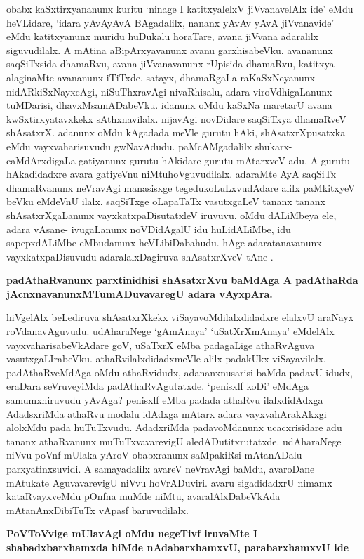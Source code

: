 obabx kaSxtirxyananunx kuritu `ninage I katitxyalelxV jiVvanavelAlx ide' eMdu heVLidare, `idara yAvAyAvA BAgadalilx, nananx yAvAv yAvA jiVvanavide' eMdu katitxyanunx muridu huDukalu horaTare, avana jiVvana adaralilx siguvudilalx. A mAtina aBipArxyavanunx avanu garxhisabeVku. avananunx saqSiTxsida dhamaRvu, avana jiVvanavanunx rUpisida dhamaRvu, katitxya alaginaMte avananunx iTiTxde. satayx, dhamaRgaLa raKaSxNeyanunx nidARkiSxNayxcAgi, niSuThxravAgi nivaRhisalu, adara viroVdhigaLanunx tuMDarisi, dhavxMsamADabeVku. idanunx oMdu kaSxNa maretarU avana kwSxtirxyatavxkekx sAthxnavilalx. nijavAgi novDidare saqSiTxya dhamaRveV shAsatxrX. adanunx oMdu kAgadada meVle gurutu hAki, shAsatxrXpusatxka eMdu vayxvaharisuvudu gwNavAdudu. paMcAMgadalilx shukarx-caMdArxdigaLa gatiyanunx gurutu hAkidare gurutu mAtarxveV adu. A gurutu hAkadidadxre avara gatiyeVnu niMtuhoVguvudilalx. adaraMte AyA saqSiTx dhamaRvanunx neVravAgi manasisxge tegedukoLuLxvudAdare alilx paMkitxyeV beVku eMdeVnU ilalx. saqSiTxge oLapaTaTx vasutxgaLeV tananx tananx shAsatxrXgaLanunx vayxkatxpaDisutatxleV iruvuvu. oMdu dALiMbeya ele, adara vAsane- ivugaLanunx noVDidAgalU idu huLidALiMbe, idu sapepxdALiMbe eMbudanunx heVLibiDabahudu. hAge adaratanavanunx vayxkatxpaDisuvudu adaralalxDagiruva shAsatxrXveV tAne
.

{\bf padAthaRvanunx parxtinidhisi shAsatxrXvu baMdAga A padAthaRda jAcnxnavanunxMTumADuvavaregU adara vAyxpAra.}                               

hiVgelAlx beLediruva shAsatxrXkekx viSayavoMdilalxdidadxre elalxvU araNayx roVdanavAguvudu. udAharaNege `gAmAnaya' `uSatXrXmAnaya' eMdelAlx vayxvaharisabeVkAdare goV, uSaTxrX eMba padagaLige athaRvAguva vasutxgaLIrabeVku. athaRvilalxdidadxmeVle alilx padakUkx viSayavilalx. padAthaRveMdAga oMdu athaRvidudx, adananxnusarisi baMda padavU idudx, eraDara seVruveyiMda padAthaRvAgutatxde. `penisxlf koDi' eMdAga samumxniruvudu yAvAga? penisxlf eMba padada athaRvu ilalxdidAdxga AdadsxriMda athaRvu modalu idAdxga mAtarx adara vayxvahArakAkxgi alolxMdu pada huTuTxvudu. AdadxriMda padavoMdanunx ucacxrisidare adu tananx athaRvanunx muTuTxvavarevigU aledADutitxrutatxde. udAharaNege niVvu poVnf mUlaka yAroV obabxranunx saMpakiRsi mAtanADalu parxyatinxsuvidi. A samayadalilx avareV neVravAgi baMdu, avaroDane mAtukate AguvavarevigU niVvu hoVrADuviri. avaru sigadidadxrU nimamx kataRvayxveMdu pOnfna muMde niMtu, avaralAlxDabeVkAda mAtanAnxDibiTuTx vApasf baruvudilalx.

{\bf PoVToVvige mUlavAgi oMdu negeTivf iruvaMte I shabadxbarxhamxda hiMde nAdabarxhamxvU, parabarxhamxvU ide}

